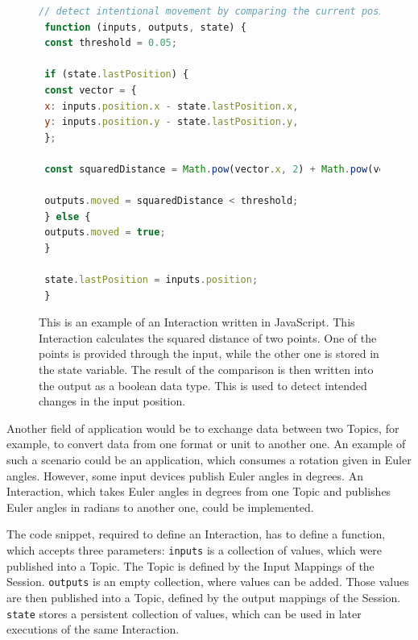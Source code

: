 \begin{figure}[H]
 \begin{lstlisting}[language=JavaScript]
 // detect intentional movement by comparing the current position with a previous one
 function (inputs, outputs, state) {
 const threshold = 0.05;

 if (state.lastPosition) {
 const vector = {
 x: inputs.position.x - state.lastPosition.x,
 y: inputs.position.y - state.lastPosition.y,
 };
 
 const squaredDistance = Math.pow(vector.x, 2) + Math.pow(vector.y, 2);
 
 outputs.moved = squaredDistance < threshold;
 } else {
 outputs.moved = true;
 }

 state.lastPosition = inputs.position;
 }
 \end{lstlisting}
 \caption[Basic UBII Interaction in JavaScript]{This is an example of an Interaction written in JavaScript. This Interaction calculates the squared distance of two points. One of the points is provided through the input, while the other one is stored in the state variable. The result of the comparison is then written into the output as a boolean data type. This is used to detect intended changes in the input position.}\label{fig:ubii-interaction-example}
\end{figure}

Another field of application would be to exchange data between two Topics, for example, to convert data from one format or unit to another one. An example of such a scenario could be an application, which consumes a rotation given in Euler angles. However, some input devices publish Euler angles in degrees. An Interaction, which takes Euler angles in degrees from one Topic and publishes Euler angles in radians to another one, could be implemented.

The code snippet, required to define an Interaction, has to define a function, which accepts three parameters: 
\lstinline{inputs} is a collection of values, which were published into a Topic. The Topic is defined by the Input Mappings of the Session. \lstinline{outputs} is an empty collection, where values can be added. Those values are then published into a Topic, defined by the output mappings of the Session. \lstinline{state} stores a persistent collection of values, which can be used in later executions of the same Interaction.